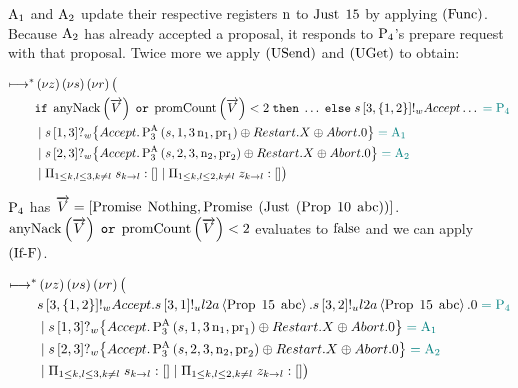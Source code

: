 $\operatorname{A_{1}}$ and $\operatorname{A_{2}}$ update their respective registers $\operatorname{n}$ to $\operatorname{Just}\; 15$ by applying $\left(\operatorname{Func}\right)$.
Because $\operatorname{A_{2}}$ has already accepted a proposal, it responds to $\operatorname{P_{4}}$'s prepare request with that proposal.
Twice more we apply $\left(\operatorname{USend}\right)$ and $\left(\operatorname{UGet}\right)$ to obtain:

\begin{align*}
\longmapsto^*& \left(\nu z\right)\left(\nu s\right)\left(\nu r\right) \big (\\
&
    \mathtt{if}\; \operatorname{anyNack}\left(\overrightarrow{V}\right) \; \mathtt{or} \; \operatorname{promCount}\left(\overrightarrow{V}\right) < 2
    \;\mathtt{then}\; \ldots
    \;\mathtt{else}\;
        s\left[3, \left\{1,2\right\}\right]!_w \mathnormal{Accept}
        \ldots
    \;\textcolor{teal}{= \operatorname{P_{4}}}\\
&\; | \;
    s\left[1, 3\right]?_w \big\{
        \mathnormal{Accept} . \operatorname{P^{A}_{3}}\left(s, 1, 3 \operatorname{n}_1, \operatorname{pr}_1\right)
        \oplus \mathnormal{Restart}. X
        \oplus \mathnormal{Abort} . 0
    \big\}
    \;\textcolor{teal}{= \operatorname{A_{1}}}\\
&\; | \;
    s\left[2, 3\right]?_w \big\{
        \mathnormal{Accept} . \operatorname{P^{A}_{3}}\left(s, 2, 3, \operatorname{n}_2, \operatorname{pr}_2\right)
        \oplus \mathnormal{Restart}. X
        \oplus \mathnormal{Abort} . 0
    \big\}
    \;\textcolor{teal}{= \operatorname{A_{2}}}\\
&\; | \; \Pi_{1 \le k,l \le 3, k \neq l}\; s_{k\to l}:[]
\; | \; \Pi_{1 \le k,l \le 2, k \neq l}\; z_{k\to l}:[]
\big )
\end{align*}

$\operatorname{P_{4}}$ has $\overrightarrow{V} = \left[\operatorname{Promise}\; \operatorname{Nothing}, \operatorname{Promise}\; \left(\operatorname{Just}\; \left(\operatorname{Prop}\; 10\; \operatorname{abc}\right)\right)\right]$.
$\operatorname{anyNack}\left(\overrightarrow{V}\right) \; \mathtt{or} \; \operatorname{promCount}\left(\overrightarrow{V}\right) < 2$ evaluates to $\operatorname{false}$ and we can apply $\left(\operatorname{If-F}\right)$.

\begin{align*}
\longmapsto^*& \left(\nu z\right)\left(\nu s\right)\left(\nu r\right) \big (\\
&
    s\left[3, \left\{1,2\right\}\right]!_w \mathnormal{Accept}.
    s\left[3, 1\right]!_u l2a \left\langle \operatorname{Prop}\; 15\; \operatorname{abc} \right\rangle.
    s\left[3, 2\right]!_u l2a \left\langle \operatorname{Prop}\; 15\; \operatorname{abc} \right\rangle.
    0
    \;\textcolor{teal}{= \operatorname{P_{4}}}\\
&\; | \;
    s\left[1, 3\right]?_w \big\{
        \mathnormal{Accept} . \operatorname{P^{A}_{3}}\left(s, 1, 3 \operatorname{n}_1, \operatorname{pr}_1\right)
        \oplus \mathnormal{Restart}. X
        \oplus \mathnormal{Abort} . 0
    \big\}
    \;\textcolor{teal}{= \operatorname{A_{1}}}\\
&\; | \;
    s\left[2, 3\right]?_w \big\{
        \mathnormal{Accept} . \operatorname{P^{A}_{3}}\left(s, 2, 3, \operatorname{n}_2, \operatorname{pr}_2\right)
        \oplus \mathnormal{Restart}. X
        \oplus \mathnormal{Abort} . 0
    \big\}
    \;\textcolor{teal}{= \operatorname{A_{2}}}\\
&\; | \; \Pi_{1 \le k,l \le 3, k \neq l}\; s_{k\to l}:[]
\; | \; \Pi_{1 \le k,l \le 2, k \neq l}\; z_{k\to l}:[]
\big )
\end{align*}

